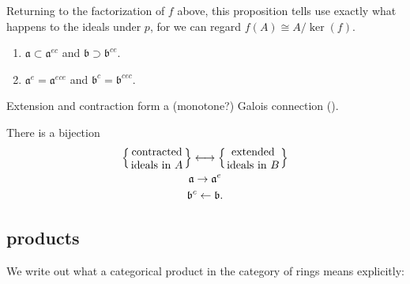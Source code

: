 \documentclass[12pt]{article}
\begin{document}
Returning to the factorization of $f$ above, this proposition tells use exactly what happens to the ideals under $p$, for we can regard $f(A)\cong A/\ker({f})$.

\begin{proposition}
	\hfill 
	\begin{enumerate}
		\item $\mathfrak{a}\subset \mathfrak{a}^{ec}$ and $\mathfrak{b}\supset \mathfrak{b}^{ce}$. 
		\item $\mathfrak{a}^e = \mathfrak{a}^{ece}$ and $\mathfrak{b}^c=\mathfrak{b}^{cec}$.
	\end{enumerate}
\end{proposition}

\begin{corollary}
	Extension and contraction form a (monotone?) Galois connection ().
\end{corollary}

\begin{corollary}
	There is a bijection
	\begin{gather*}
		\left\{\parbox{5em}{\centering{contracted ideals in $A$}}\right\} \longleftrightarrow \left\{\parbox{5em}{\centering{extended ideals in $B$}}\right\} \\
		\mathfrak{a} \rightarrow \mathfrak{a}^e \\
		\mathfrak{b}^c \leftarrow \mathfrak{b}.
	\end{gather*}
\end{corollary}


\subsection{products} %

We write out what a categorical product in the category of rings means explicitly:
\end{document}
